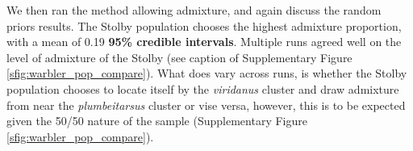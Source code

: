 \documentclass[12pt]{article}
\newcommand{\gc}[1]{{\em \color{blue} #1}}
\begin{document}

We then ran the method allowing admixture, and again discuss the random priors results. The Stolby population chooses the highest admixture proportion, with a mean of 0.19 \textbf{95\% credible intervals}.  Multiple runs agreed well on the level of admixture of the Stolby (see caption of Supplementary Figure \ref{sfig:warbler_pop_compare}). What does vary across runs, is whether the Stolby population chooses to locate itself by the \textit{viridanus} cluster and draw admixture from near the \textit{plumbeitarsus}  cluster or vise versa, however, this is to be expected given the 50/50 nature of the sample (Supplementary Figure \ref{sfig:warbler_pop_compare}). 

\end{document}
